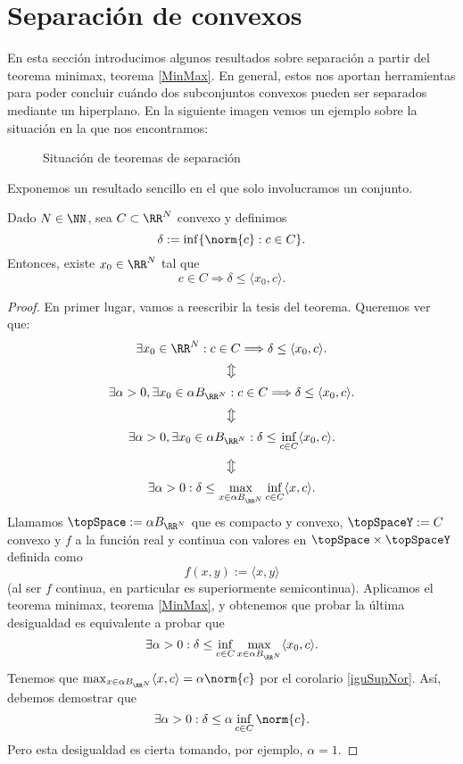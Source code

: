 \section{Separación de convexos}

En esta sección introducimos algunos resultados sobre separación a partir del teorema minimax, teorema \ref{MinMax}. En general, estos nos aportan herramientas para poder concluir cuándo dos subconjuntos convexos pueden ser separados mediante un hiperplano. En la siguiente imagen vemos un ejemplo sobre la situación en la que nos encontramos:

\begin{figure}[h!]\label{prueba}
\begin{center}
\end{center}
\caption{Situación de teoremas de separación}
\end{figure}

Exponemos un resultado sencillo en el que solo involucramos un conjunto.
\bigskip
\begin{teoremaBox}\label{sep1}
Dado $ N \in \NN $, sea $ C \subset \RR^N $ convexo y definimos
\[
\delta := \inf\{ \norm{c}: c \in C \}.
\]
Entonces, existe $ x_0 \in \RR^N $ tal que 
\[
c \in C \Longrightarrow \delta \leq \langle x_0,c\rangle.
\]
\end{teoremaBox}
\begin{proof}
En primer lugar, vamos a reescribir la tesis del teorema. Queremos ver que:
\[
\exists x_0 \in \RR^N : c \in C \Longrightarrow \delta \leq \langle x_0,c\rangle.
\]
\[
\big\Updownarrow
\]
\[
\exists \alpha > 0, \exists x_0 \in \alpha B_{\RR^N} : c \in C \Longrightarrow \delta \leq \langle x_0,c\rangle.
\]
\[
\big\Updownarrow
\]
\[
\exists \alpha > 0, \exists x_0 \in \alpha B_{\RR^N} : \delta \leq \inf_{c\in C}\langle x_0,c\rangle.
\]
\[
\big\Updownarrow
\]
\[
\exists \alpha > 0 : \delta \leq \max_{x\in \alpha B_{\RR^N}}\inf_{c\in C}\langle x,c\rangle.
\]
Llamamos $ \topSpace := \alpha B_{\RR^N}$ que es compacto y convexo, $ \topSpaceY:= C$ convexo y $ f $ a la función real y continua con valores en $ \topSpace \times \topSpaceY $ definida como \[ f(x,y):=\langle x,y \rangle \] (al ser $ f $ continua, en particular es superiormente semicontinua). Aplicamos el teorema minimax, teorema \ref{MinMax}, y obtenemos que probar la última desigualdad es equivalente a probar que
\[
\exists \alpha > 0 : \delta \leq \inf_{c\in C}\max_{x\in \alpha B_{\RR^N}}\langle x_0,c\rangle.
\]
Tenemos que $ \max_{x\in \alpha B_{\RR^N}}\langle x,c\rangle = \alpha \norm{c} $ por el corolario \ref{iguSupNor}. Así, debemos demostrar que
\[
\exists \alpha > 0 : \delta \leq \alpha \inf_{c\in C}  \norm{c}.
\]
Pero esta desigualdad es cierta tomando, por ejemplo, $ \alpha = 1 $.
\end{proof}
\bigskip

